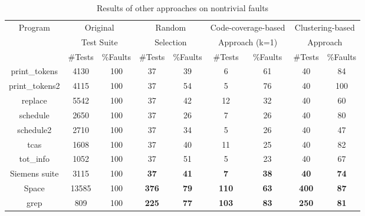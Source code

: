 \documentclass{sig-alternate}
\begin{document}
\begin{table}[htbp]
\caption{Results of other approaches on nontrivial
faults}\label{tab:other:nontrivial} \center
\begin{tabular}{|c|c|c|c|c|c|c|c|c|}

\hline Program   & \multicolumn{2}{c}{Original } \vline &
\multicolumn{2}{c}{Random} \vline &
\multicolumn{2}{c}{Code-coverage-based} \vline &
\multicolumn{2}{c}{Clustering-based} \vline     \\

& \multicolumn{2}{c}{Test Suite} \vline &
\multicolumn{2}{c}{Selection} \vline & \multicolumn{2}{c}{Approach
(k=1)} \vline &
\multicolumn{2}{c}{Approach} \vline     \\

 \cline{2-9}  & \#Tests &   \%Faults & \#Tests &   \%Faults &
\#Tests &   \%Faults & \#Tests &   \%Faults \\


\hline  print\_tokens   &   4130    &   100 &   37  &   39&   6   &   61  &   40  &   84  \\
\hline  print\_tokens2  &   4115    &   100 &   37  &   54&   5   &   76  &   40  &   100 \\
\hline  replace &   5542    &   100 &   37  &   42&   12  &   32  &   40  &   60  \\
\hline  schedule    &   2650    &   100 &   37  &   26&   7   &   26  &   40  &   80  \\
\hline  schedule2   &   2710    &   100 &   37  &   34&   5   &   26  &   40  &   47  \\
\hline  tcas    &   1608    &   100 &   37  &   40&   11  &   25  &   40  &   82  \\
\hline  tot\_info &   1052    &   100 &   37  &   51&   5   &   23  &   40  &   67  \\
\hline  Siemens suite   &   3115    &   100 &   \textbf{37}  &   \textbf{41}&   \textbf{7}   &   \textbf{38}  &   \textbf{40}  &   \textbf{74}  \\
\hline  Space   &   13585   &   100 &   \textbf{376} &   \textbf{79}&   \textbf{110} &   \textbf{63}  &   \textbf{400} &   \textbf{87}  \\
\hline  grep    &   809 &   100 &   \textbf{225} &   \textbf{77}&   \textbf{103} &   \textbf{83}  &   \textbf{250} &   \textbf{81}  \\

\hline
\end{tabular}
\end{table}
\end{document}

